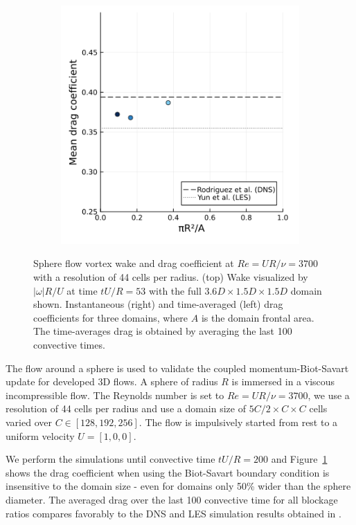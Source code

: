 \documentclass[final,1p,times]{elsarticle}
\begin{document}
\begin{figure}
    \begin{subfigure}{.4\textwidth}
        \centering
        \includegraphics[width=\textwidth]{tex/fig/validation_sphere.png}
    \end{subfigure}
    \caption{Sphere flow vortex wake and drag coefficient at $Re = UR/\nu= 3700$ with a resolution of 44 cells per radius. (top) Wake visualized by $|\omega|R/U$ at time $tU/R=53$ with the full $3.6D\times1.5D\times1.5D$ domain shown. Instantaneous (right) and time-averaged (left) drag coefficients for three domains, where $A$ is the domain frontal area. The time-averages drag is obtained by averaging the last 100 convective times.}
    \label{fig:sphere}
\end{figure}

The flow around a sphere is used to validate the coupled momentum-Biot-Savart update for developed 3D flows. A sphere of radius $R$ is immersed in a viscous incompressible flow. The Reynolds number is set to $Re=UR/\nu=3700$, we use a resolution of 44 cells per radius and use a domain size of $5C/2 \times C \times C$ cells varied over $C\in[128,192,256]$. The flow is impulsively started from rest to a uniform velocity $U=[1,0,0]$. 

We perform the simulations until convective time $tU/R=200$ and Figure~\ref{fig:sphere} shows the drag coefficient when using the Biot-Savart boundary condition is insensitive to the domain size - even for domains only 50\% wider than the sphere diameter. The averaged drag over the last 100 convective time for all blockage ratios compares favorably to the DNS and LES simulation results obtained in \cite{Yun2006VorticalNumbers, Rodriguez2011Direct3700}. 
\end{document}
